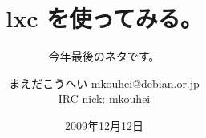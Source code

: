 




\documentclass[cjk,dvipdfmx,12pt]{beamer}
\usepackage{monthlypresentation}



\title{lxc を使ってみる。}
\subtitle{今年最後のネタです。}
\author{まえだこうへい mkouhei@debian.or.jp \\IRC nick: mkouhei}
\date{2009年12月12日}



